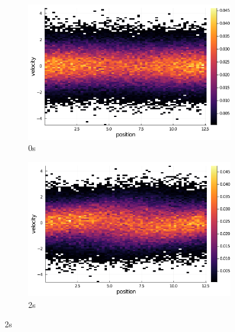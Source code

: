 \documentclass[a4paper,11pt]{article}
\begin{document}
\begin{figure}[!h]
\label{gif}
\caption{kx = 0.5, $\alpha = 0.1$}
\begin{subfigure}{0.5\textwidth}
	\centering
	\caption{0s}
	\includegraphics[width = \linewidth]{fig/kx=0.5, alpha=0.1, it=1.png}
\end{subfigure}
\begin{subfigure}{0.5\textwidth}
	\centering
	\caption{2s}
	\includegraphics[width = \linewidth]{fig/kx=0.5, alpha=0.1, it=10.png}
\end{subfigure}


\end{figure}
\end{document}
